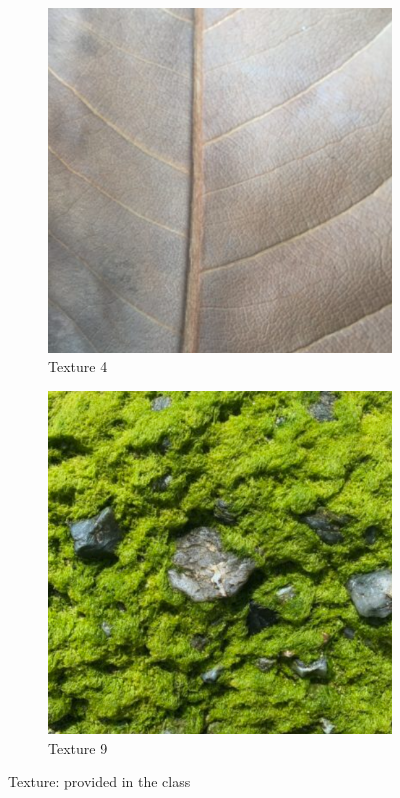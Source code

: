 \documentclass{article}
\begin{document}
\begin{figure}[htbp!]
\begin{subfigure}[b]{0.32\textwidth}
        \includegraphics[width=\textwidth]{../Code/Textures/4.png}
        \caption{Texture 4}
        \label{fig:texture-4}
    \end{subfigure}
    \hfill %
    \begin{subfigure}[b]{0.32\textwidth}
        \includegraphics[width=\textwidth]{../Code/Textures/9.png}
        \caption{Texture 9}
        \label{fig:texture-9}
    \end{subfigure}
    \caption{Texture: provided in the class}
    \label{fig:texture-class}
\end{figure}
\end{document}

